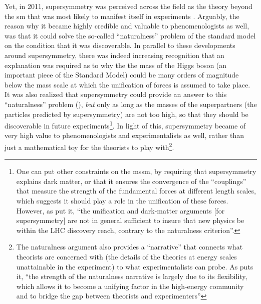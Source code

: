 \documentclass[smallextended]{svjour3}
\begin{document}
Yet, in 2011, supersymmetry was perceived across the field as the theory beyond the \gls{sm} that was most likely to manifest itself in experiments \citep{Mttig2019,Mttig2020a}. Arguably, the reason why it became highly credible and valuable to phenomenologists as well, was that it could solve the so-called ``naturalness'' problem of the standard model on the condition that it was discoverable. %
In parallel to these developments around supersymmetry, there was indeed increasing recognition that an explanation was required as to why the the mass of the Higgs boson (an important piece of the Standard Model) could be many orders of magnitude below the mass scale at which the unification of forces is assumed to take place. 
It was also realized that supersymmetry could provide an answer to this ``naturalness''  problem (\citealt{Weinberg1978,Veltman1980,Witten1982de}), \textit{but} only as long as the masses of the superpartners (the particles predicted by supersymmetry) are not too high, so that they should be discoverable in future experiments\footnote{One can put other constraints on the \gls{mssm}, by requiring that supersymmetry explains dark matter, or that it ensures the convergence of the ``couplings'' that measure the strength of the fundamental forces at different length scales, which suggests it should play a role in the unification of these forces. However, as \citealt{Giudice2004} put it, ``the unification and dark-matter arguments [for supersymmetry] are not in general sufficient to insure that new physics be within the LHC discovery reach, contrary to the naturalness criterion''.}. In light of this, supersymmetry became of very high value to phenomenologists and experimentalists as well, rather than just a mathematical toy for the theorists to play with\footnote{The naturalness argument also provides a ``narrative'' that connects what theorists are concerned with (the details of the theories at energy scales unattainable in the experiment) to what experimentalists can probe. As \citet[p.~76]{Borrelli2015} puts it, ``the strength of the naturalness narrative is largely due to its flexibility, which allows it to become a unifying factor in the high-energy community and to bridge the gap between theorists and experimenters''  }.
\end{document}
